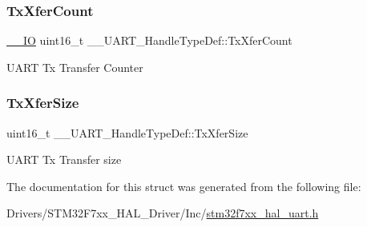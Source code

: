 \subsubsection{\texorpdfstring{TxXferCount}{TxXferCount}}
{\footnotesize\ttfamily \mbox{\hyperlink{core__sc300_8h_aec43007d9998a0a0e01faede4133d6be}{\+\_\+\+\_\+\+IO}} uint16\+\_\+t \+\_\+\+\_\+\+U\+A\+R\+T\+\_\+\+Handle\+Type\+Def\+::\+Tx\+Xfer\+Count}

U\+A\+RT Tx Transfer Counter \mbox{\label{struct_____u_a_r_t___handle_type_def_a1ba050351021762bf0414f9af78080c7}} 
\subsubsection{\texorpdfstring{TxXferSize}{TxXferSize}}
{\footnotesize\ttfamily uint16\+\_\+t \+\_\+\+\_\+\+U\+A\+R\+T\+\_\+\+Handle\+Type\+Def\+::\+Tx\+Xfer\+Size}

U\+A\+RT Tx Transfer size 

The documentation for this struct was generated from the following file\+:\begin{DoxyCompactItemize}
\item 
Drivers/\+S\+T\+M32\+F7xx\+\_\+\+H\+A\+L\+\_\+\+Driver/\+Inc/\mbox{\hyperlink{stm32f7xx__hal__uart_8h}{stm32f7xx\+\_\+hal\+\_\+uart.\+h}}\end{DoxyCompactItemize}
